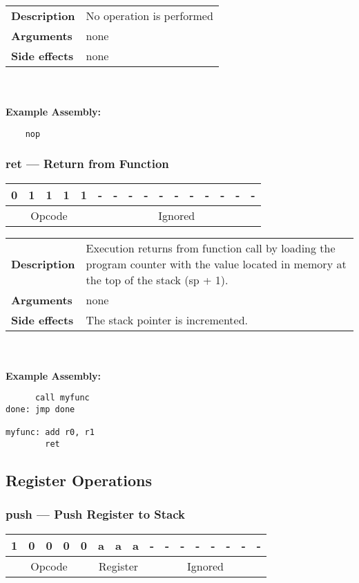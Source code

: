 \documentclass[titlepage]{article}
\begin{document}
\begin{tabular}{l p{8cm}}
{\bf Description} & No operation is performed \\
{\bf Arguments} & none \\
{\bf Side effects} & none \\
\end{tabular}\\ \\
{\bf Example Assembly:}
\begin{verbatim}
    nop
\end{verbatim}

\subsubsection{ret --- Return from Function}\begin{center}
\begin{tabular}{|c|c|c|c|c|c|c|c|c|c|c|c|c|c|c|c|}
\hline
0 & 1 & 1 & 1 & 1 & - & - & - & - & - & - & - & - & - & - & - \\
\hline
\multicolumn{5}{|c|}{Opcode} &
\multicolumn{11}{|c|}{Ignored} \\
\hline
\end{tabular}
\end{center}

\begin{tabular}{l p{8cm}}
{\bf Description} & Execution returns from function call by loading the program counter with the value located in memory at the top of the stack (sp + 1). \\
{\bf Arguments} & none \\
{\bf Side effects} & The stack pointer is incremented. \\
\end{tabular}\\ \\
{\bf Example Assembly:}
\begin{verbatim}
      call myfunc
done: jmp done

myfunc: add r0, r1
        ret
\end{verbatim}

\subsection{Register Operations}

\subsubsection{push --- Push Register to Stack}\begin{center}
\begin{tabular}{|c|c|c|c|c|c|c|c|c|c|c|c|c|c|c|c|}
\hline
1 & 0 & 0 & 0 & 0 & a & a & a & - & - & - & - & - & - & - & - \\
\hline
\multicolumn{5}{|c}{Opcode} &
\multicolumn{3}{|c}{Register} &
\multicolumn{8}{|c|}{Ignored} \\
\hline
\end{tabular}
\end{center}
\end{document}

